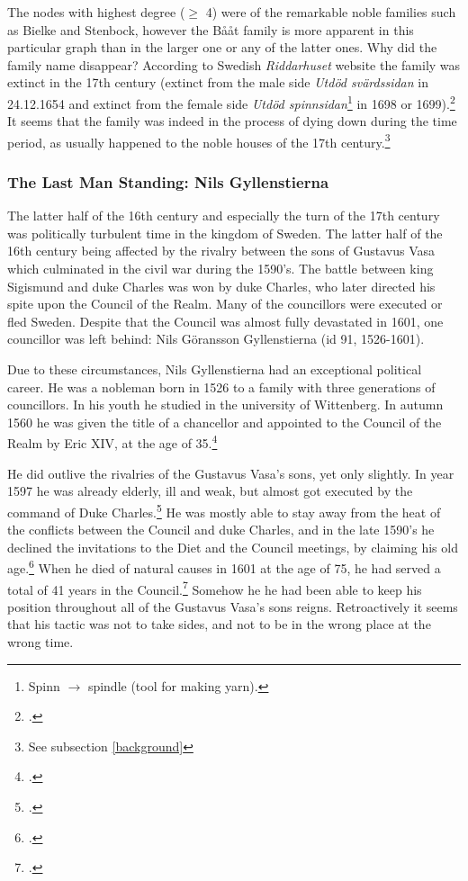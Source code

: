 The nodes with highest degree ($\geq$ 4) were of the remarkable noble families such as Bielke and Stenbock, however the Bååt family is more apparent in this particular graph than in the larger one or any of the latter ones. Why did the family name disappear? According to Swedish \textit{Riddarhuset} website the family was extinct in the 17th century (extinct from the male side \textit{Utdöd svärdssidan} in 24.12.1654 and extinct from the female side \textit{Utdöd spinnsidan}\footnote{Spinn $\rightarrow$ spindle (tool for making yarn).} in 1698 or 1699).\footcite{riddarhuset} It seems that the family was indeed in the process of dying down during the time period, as usually happened to the noble houses of the 17th century.\footnote{See subsection \ref{background}}

\subsubsection{The Last Man Standing: Nils Gyllenstierna}
The latter half of the 16th century and especially the turn of the 17th century was politically turbulent time in the kingdom of Sweden. The latter half of the 16th century being affected by the rivalry between the sons of Gustavus Vasa which culminated in the civil war during the 1590's. The battle between king Sigismund and duke Charles was won by duke Charles, who later directed his spite upon the Council of the Realm. Many of the councillors were executed or fled Sweden. Despite that the Council was almost fully devastated in 1601, one councillor was left behind: Nils Göransson Gyllenstierna (id 91, 1526-1601).

Due to these circumstances, Nils Gyllenstierna had an exceptional political career. He was a nobleman born in 1526 to a family with three generations of councillors. In his youth he studied in the university of Wittenberg. In autumn 1560 he was given the title of a chancellor and appointed to the Council of the Realm by Eric XIV, at the age of 35.\footcite{sbl_nils_gyllenstierna} 

He did outlive the rivalries of the Gustavus Vasa's sons, yet only slightly. In year 1597 he was already elderly, ill and weak, but almost got executed by the command of Duke Charles.\footcite[pp. 205-206.]{lappalainen09} He was mostly able to stay away from the heat of the conflicts between the Council and duke Charles, and in the late 1590's he declined the invitations to the Diet and the Council meetings, by claiming his old age.\footcite{sbl_nils_gyllenstierna} When he died of natural causes in 1601 at the age of 75, he had served a total of 41 years in the Council.\footcite{councillorsDS} Somehow he he had been able to keep his position throughout all of the Gustavus Vasa's sons reigns. Retroactively it seems that his tactic was not to take sides, and not to be in the wrong place at the wrong time.

